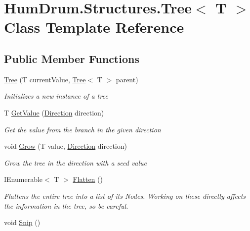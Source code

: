 \hypertarget{classHumDrum_1_1Structures_1_1Tree}{}\section{Hum\+Drum.\+Structures.\+Tree$<$ T $>$ Class Template Reference}
\label{classHumDrum_1_1Structures_1_1Tree}
\subsection*{Public Member Functions}
\begin{DoxyCompactItemize}
\item 
\hyperlink{classHumDrum_1_1Structures_1_1Tree_a046ae0a9327942fcaa6df370e673b1cb}{Tree} (T current\+Value, \hyperlink{classHumDrum_1_1Structures_1_1Tree}{Tree}$<$ T $>$ parent)
\begin{DoxyCompactList}\small\item\em Initializes a new instance of a tree \end{DoxyCompactList}\item 
T \hyperlink{classHumDrum_1_1Structures_1_1Tree_a9fc66ed4786f3ab58c1927e9dff6ddc1}{Get\+Value} (\hyperlink{namespaceHumDrum_1_1Structures_a83ca1f04475980cb7e79d471cc746dd3}{Direction} direction)
\begin{DoxyCompactList}\small\item\em Get the value from the branch in the given direction \end{DoxyCompactList}\item 
void \hyperlink{classHumDrum_1_1Structures_1_1Tree_a2b9d46fbc4593d107cc63af0283115f8}{Grow} (T value, \hyperlink{namespaceHumDrum_1_1Structures_a83ca1f04475980cb7e79d471cc746dd3}{Direction} direction)
\begin{DoxyCompactList}\small\item\em Grow the tree in the direction with a seed value \end{DoxyCompactList}\item 
I\+Enumerable$<$ T $>$ \hyperlink{classHumDrum_1_1Structures_1_1Tree_afbb935f51b88b0ea624f7e79cae89e3a}{Flatten} ()
\begin{DoxyCompactList}\small\item\em Flattens the entire tree into a list of its Nodes. Working on these directly affects the information in the tree, so be careful. \end{DoxyCompactList}\item 
void \hyperlink{classHumDrum_1_1Structures_1_1Tree_acc540c9328762ee60972eb201bac1345}{Snip} ()

\end{DoxyCompactItemize}
